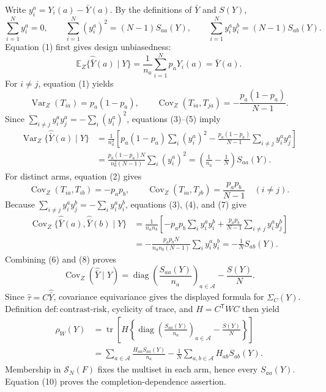 Write \(y_i^a=Y_i(a)-\bar Y(a)\). By the definitions of \(\bar Y\) and \(S(Y)\),
\[
\sum_{i=1}^Ny_i^a=0,
\qquad
\sum_{i=1}^N(y_i^a)^2=(N-1)S_{aa}(Y),
\qquad
\sum_{i=1}^Ny_i^ay_i^b=(N-1)S_{ab}(Y).
\tag{3}
\]
Equation (1) first gives design unbiasedness:
\[
\mathbb E_Z\{\widehat{\bar Y}(a)\mid Y\}
=\frac1{n_a}\sum_{i=1}^Np_aY_i(a)=\bar Y(a).
\tag{4}
\]
For \(i\ne j\), equation (1) yields
\[
\operatorname{Var}_Z(T_{ia})=p_a(1-p_a),
\qquad
\operatorname{Cov}_Z(T_{ia},T_{ja})=-\frac{p_a(1-p_a)}{N-1}.
\tag{5}
\]
Since \(\sum_{i\ne j}y_i^ay_j^a=-\sum_i(y_i^a)^2\), equations (3)--(5) imply
\[
\begin{aligned}
\operatorname{Var}_Z\{\widehat{\bar Y}(a)\mid Y\}
&=\frac1{n_a^2}\left[
p_a(1-p_a)\sum_i(y_i^a)^2
-\frac{p_a(1-p_a)}{N-1}\sum_{i\ne j}y_i^ay_j^a
\right]\\
&=\frac{p_a(1-p_a)N}{n_a^2(N-1)}\sum_i(y_i^a)^2
=\left(\frac1{n_a}-\frac1N\right)S_{aa}(Y).
\end{aligned}
\tag{6}
\]
For distinct arms, equation (2) gives
\[
\operatorname{Cov}_Z(T_{ia},T_{ib})=-p_ap_b,
\qquad
\operatorname{Cov}_Z(T_{ia},T_{jb})=\frac{p_ap_b}{N-1}\quad(i\ne j).
\tag{7}
\]
Because \(\sum_{i\ne j}y_i^ay_j^b=-\sum_i y_i^ay_i^b\), equations (3), (4), and (7) give
\[
\begin{aligned}
\operatorname{Cov}_Z\{\widehat{\bar Y}(a),\widehat{\bar Y}(b)\mid Y\}
&=\frac1{n_an_b}\left[
-p_ap_b\sum_i y_i^ay_i^b
+\frac{p_ap_b}{N-1}\sum_{i\ne j}y_i^ay_j^b
\right]\\
&=-\frac{p_ap_bN}{n_an_b(N-1)}\sum_i y_i^ay_i^b
=-\frac1N S_{ab}(Y).
\end{aligned}
\tag{8}
\]
Combining (6) and (8) proves
\[
\operatorname{Cov}_Z(\widehat{\bar Y}\mid Y)
=\operatorname{diag}\left(\frac{S_{aa}(Y)}{n_a}\right)_{a\in\mathcal A}-\frac{S(Y)}N.
\tag{9}
\]
Since \(\widehat\tau=C\widehat{\bar Y}\), covariance equivariance gives the displayed formula for \(\Sigma_C(Y)\). Definition \(\mathrm{def{:}contrast\text{-}risk}\), cyclicity of trace, and \(H=C^{\mathsf T}WC\) then yield
\[
\begin{aligned}
\rho_W(Y)
&=\operatorname{tr}\!\left[H\left\{
\operatorname{diag}\left(\frac{S_{aa}(Y)}{n_a}\right)_{a\in\mathcal A}-\frac{S(Y)}N
\right\}\right]\\
&=\sum_{a\in\mathcal A}\frac{H_{aa}S_{aa}(Y)}{n_a}
-\frac1N\sum_{a,b\in\mathcal A}H_{ab}S_{ab}(Y).
\end{aligned}
\tag{10}
\]
Membership in \(\mathcal S_N(F)\) fixes the multiset in each arm, hence every \(S_{aa}(Y)\). Equation (10) proves the completion-dependence assertion.

